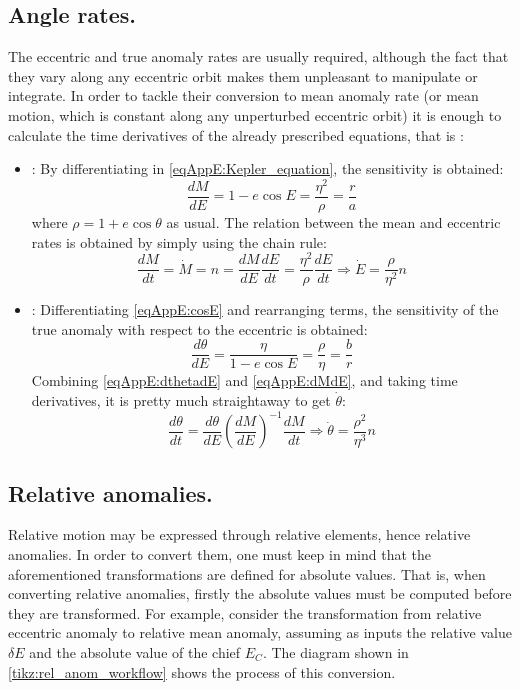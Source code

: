 	\subsection{Angle rates.}
	\indent The eccentric and true anomaly rates are usually required, although the fact that they vary along any eccentric orbit makes them unpleasant to manipulate or integrate. In order to tackle their conversion to mean anomaly rate (or mean motion, which is constant along any unperturbed eccentric orbit) it is enough to calculate the time derivatives of the already prescribed equations, that is \cite[][appendix E]{Schaub_Junkins}:
	\begin{itemize}
	\item[\GMVred{A.}] : By differentiating in \eqref{eqAppE:Kepler_equation}, the sensitivity is obtained:
	\begin{equation}
	\dfrac{dM}{dE} = 1 - e\cos E = \dfrac{\eta^2}{\rho} = \dfrac{r}{a}
	\label{eqAppE:dMdE}
	\end{equation}
	\noindent where $\rho = 1 + e\cos\theta$ as usual. The relation between the mean and eccentric rates is obtained by simply using the chain rule:
	\begin{equation}
	\dfrac{dM}{dt} = \dot{M} = n = \dfrac{dM}{dE}\dfrac{dE}{dt} = \dfrac{\eta^2}{\rho} \dfrac{dE}{dt} \Rightarrow \dot{E} = \dfrac{\rho}{\eta^2} n
	\label{eqAppE:Edot}
	\end{equation}
	\item[\GMVred{B.}] : Differentiating \eqref{eqAppE:cosE} and rearranging terms, the sensitivity of the true anomaly with respect to the eccentric is obtained\cite{Schaub_Junkins}:
	\begin{equation}
	\dfrac{d\theta}{dE} = \dfrac{\eta}{1 - e\cos E} = \dfrac{\rho}{\eta} = \dfrac{b}{r}
	\label{eqAppE:dthetadE}
	\end{equation}
	\indent Combining \eqref{eqAppE:dthetadE} and \eqref{eqAppE:dMdE}, and taking time derivatives, it is pretty much straightaway to get $\dot{\theta}$:
	\begin{equation}
	\dfrac{d\theta}{dt} = \dfrac{d\theta}{dE} \left(\dfrac{dM}{dE}\right)^{-1} \dfrac{dM}{dt} \Rightarrow \dot{\theta} = \dfrac{\rho^2}{\eta^3}n
	\label{eqAppE:thetadot}
	\end{equation}
	\end{itemize}
	
	\subsection{Relative anomalies.}
	\indent Relative motion may be expressed through relative elements, hence relative anomalies. In order to convert them, one must keep in mind that the aforementioned transformations are defined for absolute values. That is, when converting relative anomalies, firstly the absolute values must be computed before they are transformed. For example, consider the transformation from relative eccentric anomaly to relative mean anomaly, assuming as inputs the relative value $\delta E$ and the absolute value of the chief $E_C$. The diagram shown in \ref{tikz:rel_anom_workflow} shows the process of this conversion.
	
